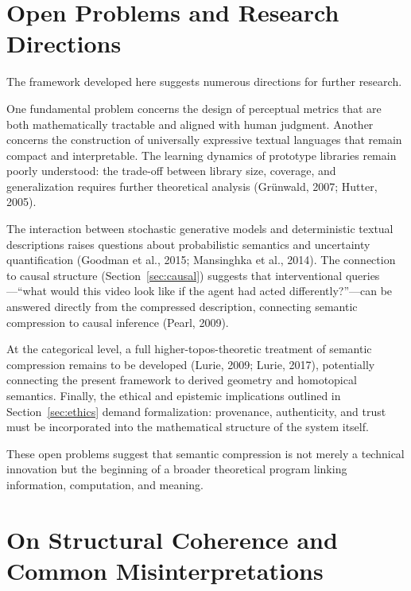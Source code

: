 \documentclass[11pt,a4paper]{article}
\theoremstyle{definition}
\theoremstyle{remark}
\begin{document}
\section{Open Problems and Research Directions}
\label{sec:open_problems}

The framework developed here suggests numerous directions for further research.

One fundamental problem concerns the design of perceptual metrics that are both mathematically tractable and aligned with human judgment. Another concerns the construction of universally expressive textual languages that remain compact and interpretable. The learning dynamics of prototype libraries remain poorly understood: the trade-off between library size, coverage, and generalization requires further theoretical analysis (Gr\"{u}nwald, 2007; Hutter, 2005).

The interaction between stochastic generative models and deterministic textual descriptions raises questions about probabilistic semantics and uncertainty quantification (Goodman et al., 2015; Mansinghka et al., 2014). The connection to causal structure (Section~\ref{sec:causal}) suggests that interventional queries---``what would this video look like if the agent had acted differently?''---can be answered directly from the compressed description, connecting semantic compression to causal inference (Pearl, 2009).

At the categorical level, a full higher-topos-theoretic treatment of semantic compression remains to be developed (Lurie, 2009; Lurie, 2017), potentially connecting the present framework to derived geometry and homotopical semantics. Finally, the ethical and epistemic implications outlined in Section~\ref{sec:ethics} demand formalization: provenance, authenticity, and trust must be incorporated into the mathematical structure of the system itself.

These open problems suggest that semantic compression is not merely a technical innovation but the beginning of a broader theoretical program linking information, computation, and meaning.

\section{On Structural Coherence and Common Misinterpretations}
\label{sec:misinterpretations}
\end{document}
